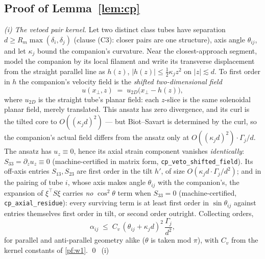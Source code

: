 \documentclass[11pt,letterpaper]{amsart}
\theoremstyle{definition}
\theoremstyle{remark}
\newcommand{\abs}[1]{\lvert #1 \rvert}
\begin{document}
\subsection{Proof of Lemma~\ref{lem:cp}}\label{pf:cp}
\emph{(i) The vetoed pair kernel.} Let two distinct class tubes have separation
$d\ge R_m\max(\delta_i,\delta_j)$ (clause (C3): closer pairs are one structure), axis
angle $\theta_{ij}$, and let $\kappa_j$ bound the companion's curvature. Near the
closest-approach segment, model the companion by its local filament and write its
transverse displacement from the straight parallel line as $h(z)$,
$\abs{h(z)}\le\tfrac12\kappa_jz^2$ on $\abs{z}\lesssim d$. To first order in $h$ the
companion's velocity field is the \emph{shifted two-dimensional field}
\[
u(x_\perp,z)\;=\;u_{2D}\bigl(x_\perp-h(z)\bigr),
\]
where $u_{2D}$ is the straight tube's planar field: each $z$-slice is the same
solenoidal planar field, merely translated. This ansatz has zero divergence, and its
curl is the tilted core to $O((\kappa_jd)^2)$ --- but Biot--Savart is determined by
the curl, so the companion's actual field differs from the ansatz only at
$O((\kappa_jd)^2)\cdot\Gamma_j/d$. The ansatz has $u_z\equiv0$, hence its axial
strain component vanishes \emph{identically}: $S_{33}=\partial_zu_z\equiv0$
(machine-certified in matrix form, \texttt{cp\_veto\_shifted\_field}). Its off-axis
entries $S_{13},S_{23}$ are first order in the tilt $h'$, of size
$O(\kappa_jd\cdot\Gamma_j/d^2)$; and in the pairing of tube $i$, whose axis makes
angle $\theta_{ij}$ with the companion's, the expansion of $\xi^{\top}S\xi$ carries
\emph{no} $\cos^2\theta$ term when $S_{33}=0$ (machine-certified,
\texttt{cp\_axial\_residue}): every surviving term is at least first order in
$\sin\theta_{ij}$ against entries themselves first order in tilt, or second order
outright. Collecting orders,
\[
\alpha_{ij}\;\le\;C_v\,(\theta_{ij}+\kappa_jd)^2\,\frac{\Gamma_j}{d^2},
\]
for parallel and anti-parallel geometry alike ($\theta$ is taken mod $\pi$), with
$C_v$ from the kernel constants of \cref{pf:w1}. \qed\ (i)
\end{document}
